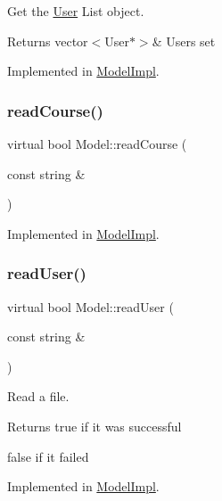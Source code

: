 Get the \hyperlink{classUser}{User} List object. 

\begin{DoxyReturn}{Returns}
vector$<$\+User$\ast$$>$\& Users set 
\end{DoxyReturn}


Implemented in \hyperlink{classModelImpl_a46f441c1ba57cc395e6732cab80e78fd}{Model\+Impl}.

\mbox{\label{classModel_a6a0784fa1dd4bffcebda8eb3bf38059e}} 
\subsubsection{\texorpdfstring{read\+Course()}{readCourse()}}
{\footnotesize\ttfamily virtual bool Model\+::read\+Course (\begin{DoxyParamCaption}\item[{const string \&}]{ }\end{DoxyParamCaption})\hspace{0.3cm}{\ttfamily [pure virtual]}}



Implemented in \hyperlink{classModelImpl_aba86d399703fe35c086d6ff5647e48da}{Model\+Impl}.

\mbox{\label{classModel_ad3fa273a7dc1397ce748c657e552d6cc}} 
\subsubsection{\texorpdfstring{read\+User()}{readUser()}}
{\footnotesize\ttfamily virtual bool Model\+::read\+User (\begin{DoxyParamCaption}\item[{const string \&}]{ }\end{DoxyParamCaption})\hspace{0.3cm}{\ttfamily [pure virtual]}}



Read a file. 

\begin{DoxyReturn}{Returns}
true if it was successful 

false if it failed 
\end{DoxyReturn}


Implemented in \hyperlink{classModelImpl_a132c46a2d6ca86c7374a065b3079fe15}{Model\+Impl}.

